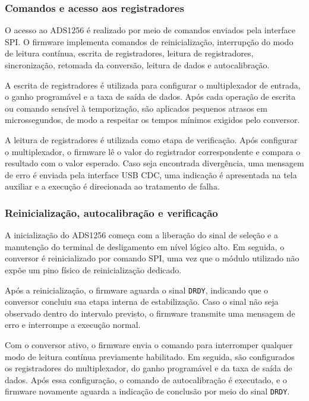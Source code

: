 \documentclass[a4paper,12pt]{fcte}
\begin{document}
\subsubsection{Comandos e acesso aos registradores}

O acesso ao ADS1256 é realizado por meio de comandos enviados pela interface SPI. O firmware implementa comandos de reinicialização, interrupção do modo de leitura contínua, escrita de registradores, leitura de registradores, sincronização, retomada da conversão, leitura de dados e autocalibração.

A escrita de registradores é utilizada para configurar o multiplexador de entrada, o ganho programável e a taxa de saída de dados. Após cada operação de escrita ou comando sensível à temporização, são aplicados pequenos atrasos em microssegundos, de modo a respeitar os tempos mínimos exigidos pelo conversor.

A leitura de registradores é utilizada como etapa de verificação. Após configurar o multiplexador, o firmware lê o valor do registrador correspondente e compara o resultado com o valor esperado. Caso seja encontrada divergência, uma mensagem de erro é enviada pela interface USB CDC, uma indicação é apresentada na tela auxiliar e a execução é direcionada ao tratamento de falha.

\subsubsection{Reinicialização, autocalibração e verificação}

A inicialização do ADS1256 começa com a liberação do sinal de seleção e a manutenção do terminal de desligamento em nível lógico alto. Em seguida, o conversor é reinicializado por comando SPI, uma vez que o módulo utilizado não expõe um pino físico de reinicialização dedicado.

Após a reinicialização, o firmware aguarda o sinal \texttt{DRDY}, indicando que o conversor concluiu sua etapa interna de estabilização. Caso o sinal não seja observado dentro do intervalo previsto, o firmware transmite uma mensagem de erro e interrompe a execução normal.

Com o conversor ativo, o firmware envia o comando para interromper qualquer modo de leitura contínua previamente habilitado. Em seguida, são configurados os registradores do multiplexador, do ganho programável e da taxa de saída de dados. Após essa configuração, o comando de autocalibração é executado, e o firmware novamente aguarda a indicação de conclusão por meio do sinal \texttt{DRDY}.
\end{document}
